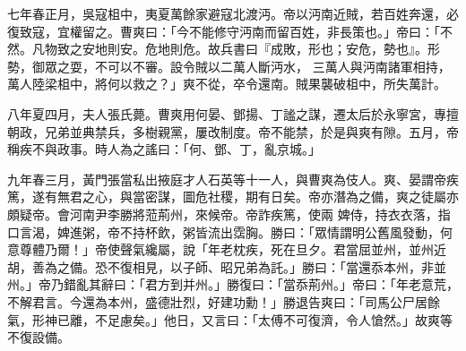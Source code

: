 \begin{pinyinscope}
 七年春正月，吳寇柤中，夷夏萬餘家避寇北渡沔。帝以沔南近賊，若百姓奔還，必復致寇，宜權留之。曹爽曰：「今不能修守沔南而留百姓，非長策也。」帝曰：「不然。凡物致之安地則安。危地則危。故兵書曰『成敗，形也；安危，勢也』。形勢，御眾之耍，不可以不審。設令賊以二萬人斷沔水，
 三萬人與沔南諸軍相持，萬人陸梁柤中，將何以救之？」爽不從，卒令還南。賊果襲破柤中，所失萬計。



 八年夏四月，夫人張氏薨。曹爽用何晏、鄧揚、丁謐之謀，遷太后於永寧宮，專擅朝政，兄弟並典禁兵，多樹親黨，屢改制度。帝不能禁，於是與爽有隙。五月，帝稱疾不與政事。時人為之謠曰：「何、鄧、丁，亂京城。」



 九年春三月，黃門張當私出掖庭才人石英等十一人，與曹爽為伎人。爽、晏謂帝疾篤，遂有無君之心，與當密謀，圖危社稷，期有日矣。帝亦潛為之備，爽之徒屬亦頗疑帝。會河南尹李勝將蒞荊州，來候帝。帝詐疾篤，使兩
 婢侍，持衣衣落，指口言渴，婢進粥，帝不持杯飲，粥皆流出霑胸。勝曰：「眾情謂明公舊風發動，何意尊體乃爾！」帝使聲氣纔屬，說「年老枕疾，死在旦夕。君當屈並州，並州近胡，善為之備。恐不復相見，以子師、昭兄弟為託。」勝曰：「當還忝本州，非並州。」帝乃錯亂其辭曰：「君方到并州。」勝復曰：「當忝荊州。」帝曰：「年老意荒，不解君言。今還為本州，盛德壯烈，好建功勳！」勝退告爽曰：「司馬公尸居餘氣，形神已離，不足慮矣。」他日，又言曰：「太傅不可復濟，令人愴然。」故爽等不復設備。




\end{pinyinscope}
